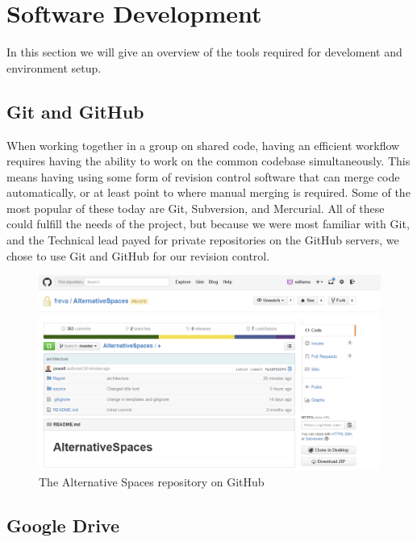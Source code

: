 \section{Software Development}
\label{sec:PlanningSoftwareDev}

In this section we will give an overview of the tools required for develoment and environment setup.

\subsection{Git and GitHub}
\label{subsec:PlanningSoftwareDevGit}

When working together in a group on shared code, having an efficient workflow requires having the ability to work on the common codebase simultaneously. This means having using some form of revision control software that can merge code automatically, or at least point to where manual merging is required. Some of the most popular of these today are Git, Subversion, and Mercurial. All of these could fulfill the needs of the project, but because we were most familiar with Git, and the Technical lead payed for private repositories on the GitHub servers, we chose to use Git and GitHub for our revision control.

\begin{figure}[ht!]
  \centering
  \includegraphics[width=\linewidth]{./Planning/img/ASpacesRepo}
  \caption{The Alternative Spaces repository on GitHub}
  \label{fig:PlanningSoftwareDevGitRepo}
\end{figure}

\subsection{Google Drive}
\label{subsec:PlanningSoftwareDevDrive}

